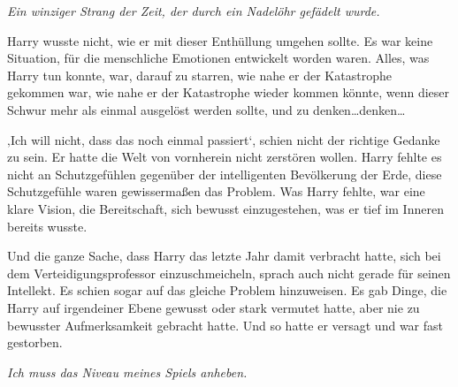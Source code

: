 \emph{Ein winziger Strang der Zeit, der durch ein Nadelöhr gefädelt wurde.}

Harry wusste nicht, wie er mit dieser Enthüllung umgehen sollte. Es war keine Situation, für die menschliche Emotionen entwickelt worden waren. Alles, was Harry tun konnte, war, darauf zu starren, wie nahe er der Katastrophe gekommen war, wie nahe er der Katastrophe wieder kommen könnte, wenn dieser Schwur mehr als einmal ausgelöst werden sollte, und zu denken…denken…

‚Ich will nicht, dass das noch einmal passiert‘, schien nicht der richtige Gedanke zu sein. Er hatte die Welt von vornherein nicht zerstören wollen. Harry fehlte es nicht an Schutzgefühlen gegenüber der intelligenten Bevölkerung der Erde, diese Schutzgefühle waren gewissermaßen das Problem. Was Harry fehlte, war eine klare Vision, die Bereitschaft, sich bewusst einzugestehen, was er tief im Inneren bereits wusste.

Und die ganze Sache, dass Harry das letzte Jahr damit verbracht hatte, sich bei dem Verteidigungsprofessor einzuschmeicheln, sprach auch nicht gerade für seinen Intellekt. Es schien sogar auf das gleiche Problem hinzuweisen. Es gab Dinge, die Harry auf irgendeiner Ebene gewusst oder stark vermutet hatte, aber nie zu bewusster Aufmerksamkeit gebracht hatte. Und so hatte er versagt und war fast gestorben.

\emph{Ich muss das Niveau meines Spiels anheben.}

